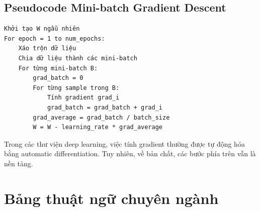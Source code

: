 \documentclass[12pt,a4paper]{report}
\begin{document}
\section{Pseudocode Mini-batch Gradient Descent}

\begin{verbatim}
Khởi tạo W ngẫu nhiên
For epoch = 1 to num_epochs:
    Xáo trộn dữ liệu
    Chia dữ liệu thành các mini-batch
    For từng mini-batch B:
        grad_batch = 0
        For từng sample trong B:
            Tính gradient grad_i
            grad_batch = grad_batch + grad_i
        grad_average = grad_batch / batch_size
        W = W - learning_rate * grad_average
\end{verbatim}

\begin{luuy}
Trong các thư viện deep learning, việc tính gradient thường được tự động hóa bằng automatic differentiation. Tuy nhiên, về bản chất, các bước phía trên vẫn là nền tảng.
\end{luuy}

\chapter{Bảng thuật ngữ chuyên ngành}
\end{document}
